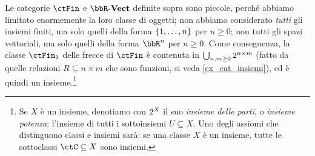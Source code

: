 Le categorie \(\ctFin\) e \(\ctVect[\bbR]\) definite sopra sono piccole, perché abbiamo limitato enormemente la loro classe di oggetti; non abbiamo considerato \emph{tutti} gli insiemi finiti, ma solo quelli della forma \(\{\iter n\}\) per \(n\ge 0\); non tutti gli spazi vettoriali, ma solo quelli della forma \(\bbR^n\) per \(n\ge 0\). Come conseguenza, la classe \(\ctFin_1\) delle frecce di \(\ctFin\) è contenuta in
\(\bigcup_{n,m\ge 0}2^{n\times m}\)
(fatto da quelle relazioni \(R\subseteq n\times m\) che sono funzioni, si veda \ref{ex_cat_insiemi}), ed è quindi un insieme.\footnote{Se \(X\) è un insieme, denotiamo con \(2^{X}\) il suo \emph{insieme delle parti}, o \emph{insieme potenza}: l'insieme di tutti i sottoinsiemi \(U\subseteq X\). Uno degli assiomi che distinguono classi e insiemi sarà: se una classe \(X\) è un insieme, tutte le sottoclassi \(\ctC\subseteq X\) sono insiemi.}

